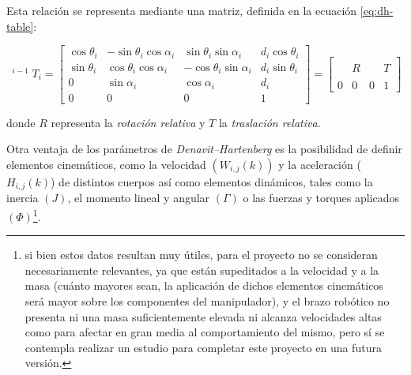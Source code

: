 Esta relación se representa mediante una matriz, definida en la ecuación \ref{eq:dh-table}:

\begin{equation}
    {
    \displaystyle \operatorname {}
    ^{i-1}T_{i}=\left[{
                \begin{array}{ccc|c}
                    \cos{\theta_{i}} & -\sin{\theta_{i}}\cos{\alpha_{i}} & \sin{\theta_{i}}\sin{\alpha_{i}}  & d_{i}\cos{\theta_{i}} \\
                    \sin{\theta_{i}} & \cos{\theta_{i}}\cos{\alpha_{i}}  & -\cos{\theta_{i}}\sin{\alpha_{i}} & d_{i}\sin{\theta_{i}} \\
                    0                & \sin{\alpha_{i}}                  & \cos{\alpha_{i}}                  & d_{i}                 \\
                    \hline
                    0                & 0                                 & 0                                 & 1
                \end{array}}\right] =
    \left[{
                \begin{array}{ccc|c}
                      &   &   &   \\
                      & R &   & T \\
                      &   &   &   \\
                    \hline
                    0 & 0 & 0 & 1
                \end{array}}
        \right]
    }
\end{equation}
\label{eq:dh-table}

donde $R$ representa la \textit{rotación relativa} y $T$ la \textit{traslación relativa}.

Otra ventaja de los parámetros de \textit{Denavit--Hartenberg} es la posibilidad de
definir elementos cinemáticos, como la velocidad $\left(W_{i,j}(k)\right)$ y la aceleración ($H_{i,j}(k)$)
de distintos cuerpos así como elementos dinámicos, tales como la inercia $\left(J\right)$,
el momento lineal y angular $\left(\Gamma\right)$ o las fuerzas y torques aplicados
$\left(\Phi\right)$\footnote{si bien estos datos resultan muy útiles, para el proyecto no se consideran
    necesariamente relevantes, ya que están supeditados a la velocidad y a la masa (cuánto mayores sean,
    la aplicación de dichos elementos cinemáticos será mayor sobre los componentes del
    manipulador), y el brazo robótico no presenta ni una masa suficientemente elevada ni alcanza velocidades altas
    como para afectar en gran media al comportamiento del mismo, pero sí se contempla realizar un estudio para completar
    este proyecto en una futura versión.}.

